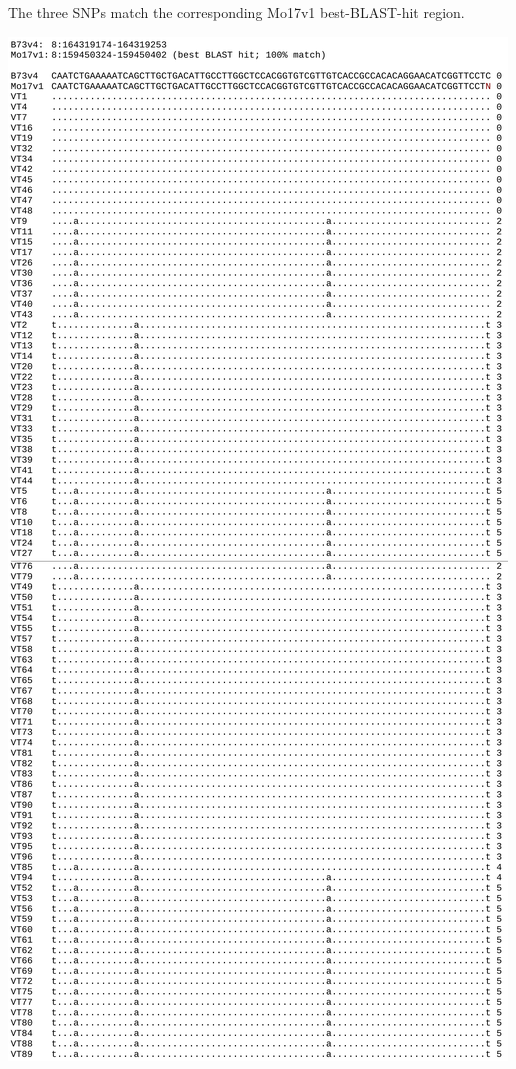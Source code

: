 \documentclass[maize,portrait]{a0poster}
\newlength{\figwidth}
\begin{document}
\begin{multicols}{3}
\begin{minipage}[t]{0.48\linewidth}
{      The three SNPs match the corresponding Mo17v1 best-BLAST-hit region.
    }
  \end{minipage}
  \begin{minipage}[t]{0.04\linewidth}
    \hfill
  \end{minipage}
  \begin{minipage}[t]{0.48\linewidth}
    \includegraphics[width=0.48\figwidth]{8.164319174-164319253.png}
  \end{minipage}
    

\end{multicols}
\end{document}
